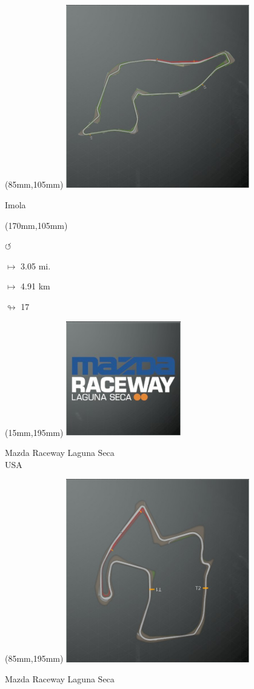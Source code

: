 \begin{textblock*}{80mm}(85mm,105mm)%
\includegraphics[width=80mm]{TR/2015-05-20_00030.png}
\centerline{Imola}
\end{textblock*}
\begin{textblock*}{30mm}(170mm,105mm)%
\par \Huge$\circlearrowleft$
\Large
\par$\mapsto$ 3.05 mi.
\par$\mapsto$ 4.91 km
\par$\looparrowright$ 17
\end{textblock*}
\begin{textblock*}{60mm}(15mm,195mm)%
\includegraphics[width=50mm]{LG/2015-05-20_00085.png}
\par Mazda Raceway Laguna Seca\\ USA
\end{textblock*}
\begin{textblock*}{80mm}(85mm,195mm)%
\includegraphics[width=80mm]{TR/2015-05-21_00001.png}
\centerline{Mazda Raceway Laguna Seca}
\end{textblock*}
